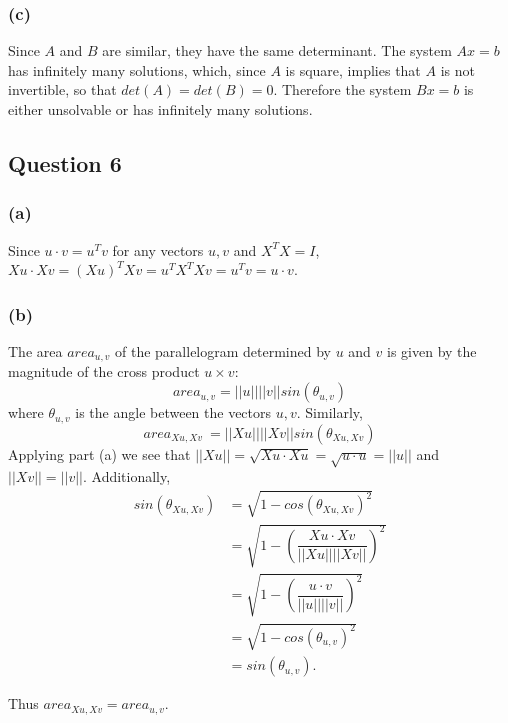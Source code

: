 \documentclass{article}
\begin{document}
\subsubsection*{(c)}
Since $A$ and $B$ are similar, they have the same determinant.  The system
$Ax = b$ has infinitely many solutions, which, since $A$ is square, implies 
that $A$ is not invertible, so that $det(A) = det(B) = 0$.  Therefore the 
system $Bx = b$ is either unsolvable or has infinitely many solutions.

\subsection*{Question 6}

\subsubsection*{(a)}
Since $u \cdot v = u^{T}v$ for any vectors $u, v$ and $X^{T}X = I$, $Xu
\cdot Xv = (Xu)^{T}Xv = u^{T}X^{T}Xv = u^{T}v = u \cdot v$.

\subsubsection*{(b)}
The area $area_{u,v}$ of the parallelogram determined by $u$ and $v$ is given by the magnitude of the cross product $u \times v$:
\[area_{u,v} = ||u||||v|| sin(\theta_{u,v})\]
where $\theta_{u,v}$ is the angle between the vectors $u, v$.  Similarly,
\[area_{Xu,Xv}\ = ||Xu||||Xv|| sin(\theta_{Xu,Xv})\]
Applying part (a) we see that $||Xu|| = \sqrt{Xu \cdot Xu} = \sqrt{u \cdot u} = ||u||$ and $||Xv|| = ||v||$.  Additionally,
\begin{align*}
 sin(\theta_{Xu,Xv}) &= \sqrt{1 - cos(\theta_{Xu,Xv})^{2}} \\
 & = \sqrt{1 - (\dfrac{Xu \cdot Xv}{||Xu||||Xv||})^{2}} \\
 &= \sqrt{1 - (\dfrac{u \cdot v}{||u||||v||})^{2}} \\
 &= \sqrt{1 - cos(\theta_{u,v})^{2}} \\
 &= sin(\theta_{u,v}).
\end{align*}

Thus $area_{Xu,Xv} = area_{u,v}$.
\end{document}
